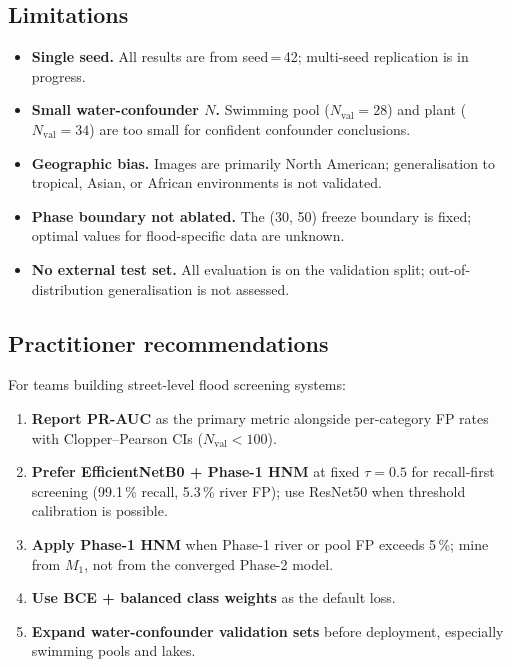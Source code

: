 \documentclass[a4paper,fleqn]{cas-sc}
\newcommand{\EffNet}{EfficientNetB0\xspace}
\newcommand{\ResNet}{ResNet50\xspace}
\newcommand{\PHNM}{Phase-1 HNM\xspace}
\newcommand{\PR}{PR-AUC\xspace}
\newcommand{\CP}{Clopper--Pearson\xspace}
\begin{document}
\subsection{Limitations}
\label{sec:discussion:limits}

\begin{itemize}
  \item \textbf{Single seed.} All results are from seed\,=\,42; multi-seed replication is in progress.
  \item \textbf{Small water-confounder $N$.} Swimming pool ($N_\text{val}{=}28$) and plant ($N_\text{val}{=}34$) are too small for confident confounder conclusions.
  \item \textbf{Geographic bias.} Images are primarily North American; generalisation to tropical, Asian, or African environments is not validated.
  \item \textbf{Phase boundary not ablated.} The (30, 50) freeze boundary is fixed; optimal values for flood-specific data are unknown.
  \item \textbf{No external test set.} All evaluation is on the validation split; out-of-distribution generalisation is not assessed.
\end{itemize}

\subsection{Practitioner recommendations}
\label{sec:discussion:recs}

For teams building street-level flood screening systems:
\begin{enumerate}
  \item \textbf{Report \PR{}} as the primary metric alongside per-category FP rates with \CP{} CIs ($N_\text{val}{<}100$).
  \item \textbf{Prefer \EffNet{} + \PHNM{}} at fixed $\tau{=}0.5$ for recall-first screening (99.1\,\% recall, 5.3\,\% river FP); use \ResNet{} when threshold calibration is possible.
  \item \textbf{Apply \PHNM{}} when Phase-1 river or pool FP exceeds 5\,\%; mine from $M_1$, not from the converged Phase-2 model.
  \item \textbf{Use BCE + balanced class weights} as the default loss.
  \item \textbf{Expand water-confounder validation sets} before deployment, especially swimming pools and lakes.
\end{enumerate}

\end{document}
